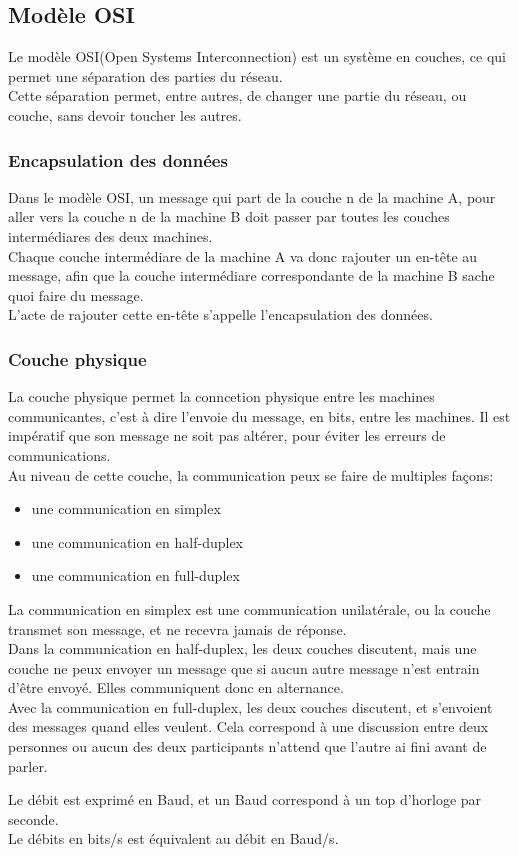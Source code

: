 \subsection{Modèle OSI}
Le modèle OSI(Open Systems Interconnection) est un système en couches, ce qui permet une séparation des parties du
réseau.\\
Cette séparation permet, entre autres, de changer une partie du réseau, ou couche, sans devoir toucher les autres.

\subsubsection{Encapsulation des données}
Dans le modèle OSI, un message qui part de la couche n de la machine A, pour aller vers la couche n de la machine B
doit passer par toutes les couches intermédiares des deux machines.\\
Chaque couche intermédiare de la machine A va donc rajouter un en-tête au message, afin que la couche intermédiare
correspondante de la machine B sache quoi faire du message.\\
L'acte de rajouter cette en-tête s'appelle l'encapsulation des données.

\subsubsection{Couche physique}
La couche physique permet la conncetion physique entre les machines communicantes, c'est à dire l'envoie du message,
en bits, entre les machines. Il est impératif que son message ne soit pas altérer, pour éviter les erreurs de
communications.\\
Au niveau de cette couche, la communication peux se faire de multiples façons:
\begin{itemize}
	\item une communication en simplex
	\item une communication en half-duplex
	\item une communication en full-duplex
\end{itemize}

La communication en simplex est une communication unilatérale, ou la couche transmet son message, et ne recevra
jamais de réponse.\\
Dans la communication en half-duplex, les deux couches discutent, mais une couche ne peux envoyer un
message que si aucun autre message n'est entrain d'être envoyé. Elles communiquent donc en alternance.\\
Avec la communication en full-duplex, les deux couches discutent, et s'envoient des messages quand elles veulent.
Cela correspond à une discussion entre deux personnes ou aucun des deux participants n'attend que l'autre ai fini
avant de parler.

Le débit est exprimé en Baud, et un Baud correspond à un top d'horloge par seconde.\\
Le débits en bits/s est équivalent au débit en Baud/s.
